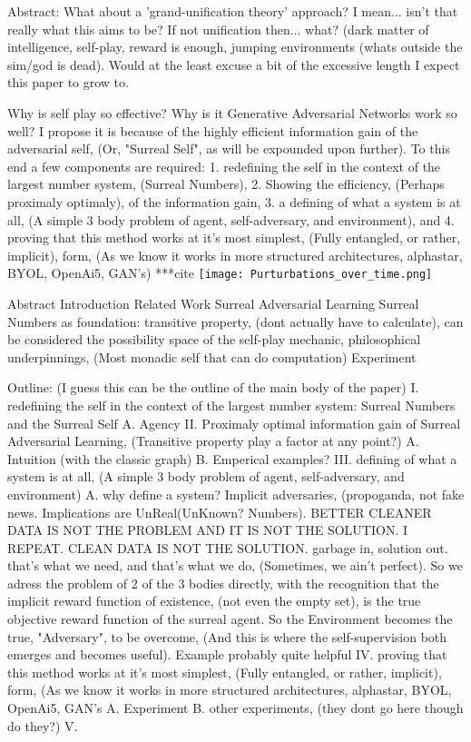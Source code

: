 \documentclass{article}
\begin{document}
\usepackage{graphicx}
Abstract: 
What about a 'grand-unification theory' approach? I mean... isn't that really what this aims to be? If not unification then... what? (dark matter of intelligence, self-play, reward is enough, jumping environments (whats outside the sim/god is dead). Would at the least excuse a bit of the excessive length I expect this paper to grow to.

Why is self play so effective? Why is it Generative Adversarial Networks work so well? I propose it is because of the highly efficient information gain of the adversarial self, (Or, "Surreal Self", as will be expounded upon further). To this end a few components are required: 1. redefining the self in the context of the largest number system, (Surreal Numbers), 2. Showing the efficiency, (Perhaps proximaly optimaly), of the information gain, 3. a defining of what a system is at all, (A simple 3 body problem of agent, self-adversary, and environment), and 4. proving that this method works at it's most simplest, (Fully entangled, or rather, implicit), form, (As we know it works in more structured architectures, alphastar, BYOL, OpenAi5, GAN's) ***cite 
\texttt{[image: Purturbations\_over\_time.png]}

Abstract
Introduction
Related Work
Surreal Adversarial Learning
	Surreal Numbers as foundation: transitive property, (dont actually have to calculate), can be considered the possibility space of the self-play mechanic, philosophical underpinnings, (Most monadic self that can do computation)
Experiment

Outline: (I guess this can be the outline of the main body of the paper)
I. redefining the self in the context of the largest number system: Surreal Numbers and the Surreal Self
	A. Agency
II. Proximaly optimal information gain of Surreal Adversarial Learning, (Transitive property play a factor at any point?)
	A. Intuition (with the classic graph)
	B. Emperical examples?
III. defining of what a system is at all, (A simple 3 body problem of agent, self-adversary, and environment)
	A. why define a system? Implicit adversaries, (propoganda, not fake news.
 	Implications are UnReal(UnKnown? Numbers). BETTER CLEANER DATA IS
	NOT THE PROBLEM AND IT IS NOT THE SOLUTION. I REPEAT. CLEAN
	DATA IS NOT THE SOLUTION. garbage in, solution out. that's what we
	need, and that's what we do, (Sometimes, we ain't perfect). So we adress
	the problem of 2 of the 3 bodies directly, with the recognition that the
	implicit reward function of existence, (not even the empty set), is the true 
	objective reward function of the surreal agent. So the Environment becomes the true, "Adversary", to be overcome, (And this is where the self-supervision both emerges and becomes useful). Example probably quite helpful
IV. proving that this method works at it's most simplest, (Fully entangled, or
	rather, implicit), form, (As we know it works in more structured
	architectures, alphastar, BYOL, OpenAi5, GAN's
	A. Experiment
	B. other experiments, (they dont go here though do they?)
V. 
\end{document}
